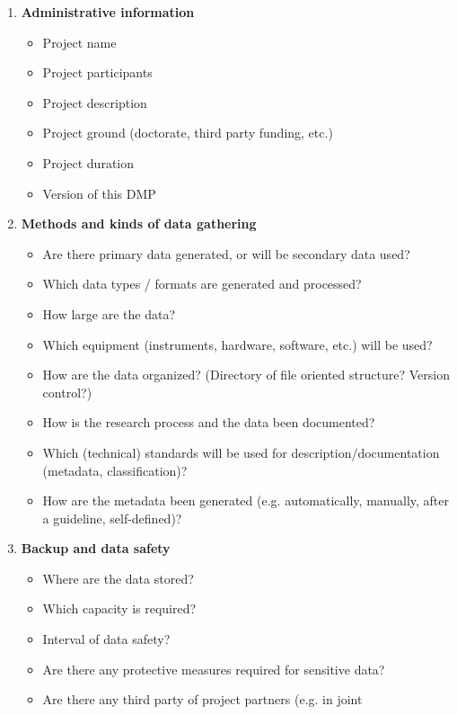 \begin{enumerate}[start=0, label=\textbf{\arabic*})]
  \item \textbf{Administrative information}
        \begin{itemize}
          \item Project name
          \item Project participants
          \item Project description
          \item Project ground (doctorate, third party funding, etc.)
          \item Project duration
          \item Version of this DMP
        \end{itemize}
  \item \textbf{Methods and kinds of data gathering}
        \begin{itemize}
          \item Are there primary data generated, or will be secondary data used?
          \item Which data types / formats are generated and processed?
          \item How large are the data?
          \item Which equipment (instruments, hardware, software, etc.)
                will be used?
          \item How are the data organized? (Directory of file oriented
                structure? Version control?)
          \item How is the research process and the data been documented?
          \item Which (technical) standards will be used for
                description/documentation (metadata, classification)?
          \item How are the metadata been generated (e.g. automatically,
                manually, after a guideline, self-defined)?
        \end{itemize}
  \item \textbf{Backup and data safety}
        \begin{itemize}
          \item Where are the data stored?
          \item Which capacity is required?
          \item Interval of data safety?
          \item Are there any protective measures required for sensitive data?
          \item Are there any third party of project partners (e.g. in joint

\end{itemize}
\end{enumerate}
